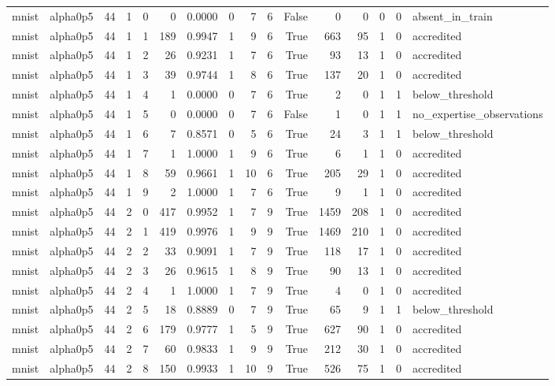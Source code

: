 \begin{tabular}{llrrrrrrrrrrrrrl}
mnist & alpha0p5 & 44 & 1 & 0 & 0 & 0.0000 & 0 & 7 & 6 & False & 0 & 0 & 0 & 0 & absent\_in\_train \\
mnist & alpha0p5 & 44 & 1 & 1 & 189 & 0.9947 & 1 & 9 & 6 & True & 663 & 95 & 1 & 0 & accredited \\
mnist & alpha0p5 & 44 & 1 & 2 & 26 & 0.9231 & 1 & 7 & 6 & True & 93 & 13 & 1 & 0 & accredited \\
mnist & alpha0p5 & 44 & 1 & 3 & 39 & 0.9744 & 1 & 8 & 6 & True & 137 & 20 & 1 & 0 & accredited \\
mnist & alpha0p5 & 44 & 1 & 4 & 1 & 0.0000 & 0 & 7 & 6 & True & 2 & 0 & 1 & 1 & below\_threshold \\
mnist & alpha0p5 & 44 & 1 & 5 & 0 & 0.0000 & 0 & 7 & 6 & False & 1 & 0 & 1 & 1 & no\_expertise\_observations \\
mnist & alpha0p5 & 44 & 1 & 6 & 7 & 0.8571 & 0 & 5 & 6 & True & 24 & 3 & 1 & 1 & below\_threshold \\
mnist & alpha0p5 & 44 & 1 & 7 & 1 & 1.0000 & 1 & 9 & 6 & True & 6 & 1 & 1 & 0 & accredited \\
mnist & alpha0p5 & 44 & 1 & 8 & 59 & 0.9661 & 1 & 10 & 6 & True & 205 & 29 & 1 & 0 & accredited \\
mnist & alpha0p5 & 44 & 1 & 9 & 2 & 1.0000 & 1 & 7 & 6 & True & 9 & 1 & 1 & 0 & accredited \\
mnist & alpha0p5 & 44 & 2 & 0 & 417 & 0.9952 & 1 & 7 & 9 & True & 1459 & 208 & 1 & 0 & accredited \\
mnist & alpha0p5 & 44 & 2 & 1 & 419 & 0.9976 & 1 & 9 & 9 & True & 1469 & 210 & 1 & 0 & accredited \\
mnist & alpha0p5 & 44 & 2 & 2 & 33 & 0.9091 & 1 & 7 & 9 & True & 118 & 17 & 1 & 0 & accredited \\
mnist & alpha0p5 & 44 & 2 & 3 & 26 & 0.9615 & 1 & 8 & 9 & True & 90 & 13 & 1 & 0 & accredited \\
mnist & alpha0p5 & 44 & 2 & 4 & 1 & 1.0000 & 1 & 7 & 9 & True & 4 & 0 & 1 & 0 & accredited \\
mnist & alpha0p5 & 44 & 2 & 5 & 18 & 0.8889 & 0 & 7 & 9 & True & 65 & 9 & 1 & 1 & below\_threshold \\
mnist & alpha0p5 & 44 & 2 & 6 & 179 & 0.9777 & 1 & 5 & 9 & True & 627 & 90 & 1 & 0 & accredited \\
mnist & alpha0p5 & 44 & 2 & 7 & 60 & 0.9833 & 1 & 9 & 9 & True & 212 & 30 & 1 & 0 & accredited \\
mnist & alpha0p5 & 44 & 2 & 8 & 150 & 0.9933 & 1 & 10 & 9 & True & 526 & 75 & 1 & 0 & accredited \\

\end{tabular}
